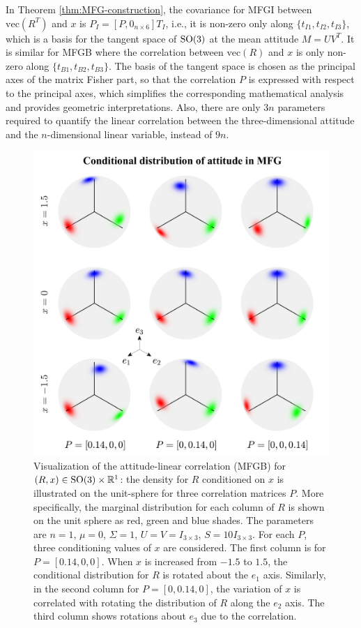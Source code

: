 In Theorem \ref{thm:MFG-construction}, the covariance for MFGI between $\mathrm{vec}(R^T)$ and $x$ is $P_I =[ P, 0_{n\times 6}]T_I$, i.e., it is non-zero only along $\{t_{I1}, t_{I2}, t_{I3}\}$, which is a basis for the tangent space of $\mathrm{SO}(3)$ at the mean attitude $M=UV^T$.
It is similar for MFGB where the correlation between $\mathrm{vec}(R)$ and $x$ is only non-zero along $\{t_{B1}, t_{B2}, t_{B3}\}$.
The basis of the tangent space is chosen as the principal axes of the matrix Fisher part, so that the correlation $P$ is expressed with respect to the principal axes, which simplifies the corresponding mathematical analysis and provides geometric interpretations.
Also, there are only $3n$ parameters required to quantify the linear correlation between the three-dimensional attitude and the $n$-dimensional linear variable, instead of $9n$.

\begin{figure}
	\centering
	\includegraphics[scale=1.4]{figures/MFG-correlation}
	\caption[Visualization of the attitude-linear correlation (MFGB) for $(R,x)\in\SO{3}\times\mathbb{R}^1$.]{Visualization of the attitude-linear correlation (MFGB) for $(R,x)\in\SO{3}\times\mathbb{R}^1$: the density for $R$ conditioned on $x$ is illustrated on the unit-sphere for three correlation matrices $P$. 
		More specifically, the marginal distribution for each column of $R$ is shown on the unit sphere as red, green and blue shades. 
		The parameters are $n=1$, $\mu=0$, $\Sigma=1$, $U=V=I_{3\times3}$, $S=10I_{3\times3}$.
		For each  $P$, three conditioning values of $x$ are considered. 
		The first column is for $P=[0.14,0,0]$.
		When $x$ is increased from $-1.5$ to $1.5$, the conditional distribution for $R$ is rotated about the $e_1$ axis. 
		Similarly, in the second column for $P=[0,0.14,0]$, the variation of $x$ is correlated with rotating the distribution of $R$ along the $e_2$ axis.
		The third column shows rotations about $e_3$ due to the correlation. \label{fig:MFG-correlation}}
\end{figure}

